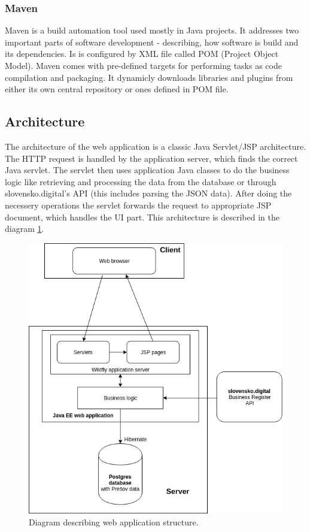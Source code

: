 \documentclass[thesis=B,english]{FITthesis}[2012/06/26]
\begin{document}
	\subsubsection{Maven}
	Maven is a build automation tool used mostly in Java projects. It addresses two important parts of software development - describing, how software is build and its dependencies. Is is configured by XML file called POM (Project Object Model). Maven comes with pre-defined targets for performing tasks as code compilation and packaging. It dynamicly downloads libraries and plugins from either its own central repository or ones defined in POM file.
	\subsection{Architecture}
	The architecture of the web application is a classic Java Servlet/JSP architecture. The HTTP request is handled by the application server, which finds the correct Java servlet. The servlet then uses application Java classes to do the business logic like retrieving and processing the data from the database or through slovensko.digital's API (this includes parsing the JSON data). After doing the necessery operations the servlet forwards the request to appropriate JSP document, which handles the UI part. This architecture is described in the diagram \ref{fig:webapp}.
	\begin{figure}[H]
  \begin{center}
  \includegraphics[scale=0.65]{pictures/webappDiagram.png}
  \caption{Diagram describing web application structure.}
    \label{fig:webapp}
  \end{center}
\end{figure}
\end{document}
